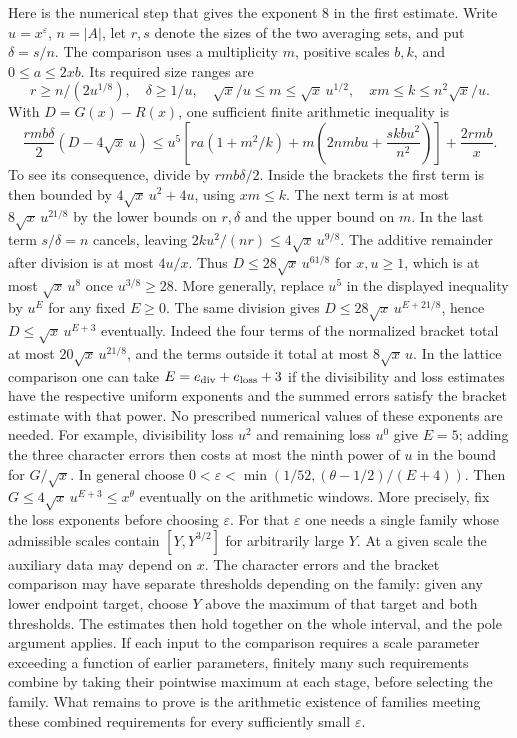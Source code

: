 \documentclass[11pt]{amsart}
\theoremstyle{definition}
\theoremstyle{remark}
\begin{document}
Here is the numerical step that gives the exponent $8$ in the
first estimate. Write $u=x^\varepsilon$, $n=|A|$, let $r,s$ denote
the sizes of the two averaging sets, and put $\delta=s/n$. The
comparison uses a multiplicity $m$, positive scales $b,k$, and
$0\le a\le2xb$. Its required size ranges are
\[
 r\ge n/(2u^{1/8}),\quad \delta\ge1/u,\quad
 \sqrt{x}/u\le m\le\sqrt{x}\,u^{1/2},\quad
 xm\le k\le n^2\sqrt{x}/u .
\]
With $D=G(x)-R(x)$, one sufficient finite arithmetic inequality is
\[
 \frac{rmb\delta}{2}(D-4\sqrt{x}\,u)
 \le u^5\left[ra(1+m^2/k)
      +m\left(2nmbu+\frac{skbu^2}{n^2}\right)\right]
      +\frac{2rmb}{x}.
\]
To see its consequence, divide by $rmb\delta/2$. Inside the
brackets the first term is then bounded by
$4\sqrt{x}\,u^2+4u$, using $xm\le k$. The next term is at most
$8\sqrt{x}\,u^{21/8}$ by the lower bounds on $r,\delta$ and the
upper bound on $m$. In the last term $s/\delta=n$ cancels,
leaving $2ku^2/(nr)\le4\sqrt{x}\,u^{9/8}$. The additive
remainder after division is at most $4u/x$. Thus
$D\le28\sqrt{x}\,u^{61/8}$ for $x,u\ge1$, which is at most
$\sqrt{x}\,u^8$ once $u^{3/8}\ge28$. More generally, replace $u^5$ in the displayed inequality by
$u^E$ for any fixed $E\ge0$. The same division gives
$D\le28\sqrt{x}\,u^{E+21/8}$, hence
$D\le\sqrt{x}\,u^{E+3}$ eventually. Indeed the four terms of
the normalized bracket total at most $20\sqrt{x}\,u^{21/8}$,
and the terms outside it total at most $8\sqrt{x}\,u$.
In the lattice comparison one can take
$E=e_{\rm div}+e_{\rm loss}+3$ if the divisibility and loss
estimates have the respective uniform exponents and the summed
errors satisfy the bracket estimate with that power. No prescribed
numerical values of these exponents are needed. For example,
divisibility loss $u^2$ and remaining loss $u^0$ give $E=5$;
adding the three character errors then costs at most the ninth
power of $u$ in the bound for $G/\sqrt x$. In general choose
$0<\varepsilon<\min(1/52,(\theta-1/2)/(E+4))$.
Then $G\le4\sqrt{x}\,u^{E+3}\le x^\theta$ eventually on the
arithmetic windows. More precisely, fix the loss exponents before
choosing $\varepsilon$. For that $\varepsilon$ one needs a single
family whose admissible scales contain $[Y,Y^{3/2}]$ for arbitrarily
large $Y$. At a given scale the auxiliary data may depend on $x$.
The character errors and the bracket comparison may have separate
thresholds depending on the family: given any lower endpoint target,
choose $Y$ above the maximum of that target and both thresholds.
The estimates then hold together on the whole interval, and the
pole argument applies. If each input to the comparison requires a
scale parameter exceeding a function of earlier parameters, finitely
many such requirements combine by taking their pointwise maximum
at each stage, before selecting the family. What remains to prove
is the arithmetic existence of families meeting these combined
requirements for every sufficiently small $\varepsilon$.
\end{document}
